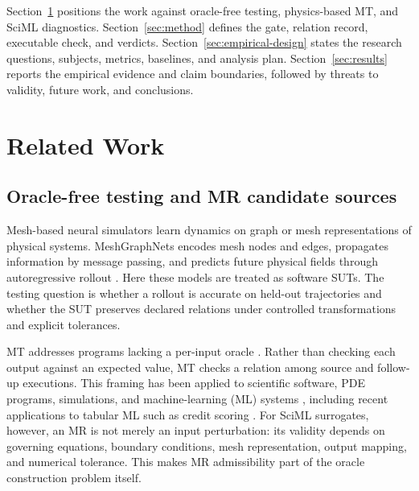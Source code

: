 \documentclass[preprint,12pt,authoryear]{elsarticle}
\begin{document}
Section~\ref{sec:related} positions the work against oracle-free testing, physics-based MT, and SciML diagnostics. Section~\ref{sec:method} defines the gate, relation record, executable check, and verdicts. Section~\ref{sec:empirical-design} states the research questions, subjects, metrics, baselines, and analysis plan. Section~\ref{sec:results} reports the empirical evidence and claim boundaries, followed by threats to validity, future work, and conclusions.

\section{Related Work}
\label{sec:related}

\subsection{Oracle-free testing and MR candidate sources}
\label{subsec:mesh-simulation}
\label{subsec:mt-oracle}
\label{subsec:mr-identification}

Mesh-based neural simulators learn dynamics on graph or mesh representations of physical systems. MeshGraphNets encodes mesh nodes and edges, propagates information by message passing, and predicts future physical fields through autoregressive rollout \citep{pfaff2021meshgraphnets}. Here these models are treated as software SUTs. The testing question is whether a rollout is accurate on held-out trajectories and whether the SUT preserves declared relations under controlled transformations and explicit tolerances.

MT addresses programs lacking a per-input oracle \citep{chen1998metamorphic,segura2016survey,chen2018mtSurvey}. Rather than checking each output against an expected value, MT checks a relation among source and follow-up executions. This framing has been applied to scientific software, PDE programs, simulations, and machine-learning (ML) systems \citep{chen2002pde,chen2011ml,kanewala2019scientific,olsen2019simulation}, including recent applications to tabular ML such as credit scoring \citep{ying2025}. For SciML surrogates, however, an MR is not merely an input perturbation: its validity depends on governing equations, boundary conditions, mesh representation, output mapping, and numerical tolerance. This makes MR admissibility part of the oracle construction problem itself.
\end{document}
